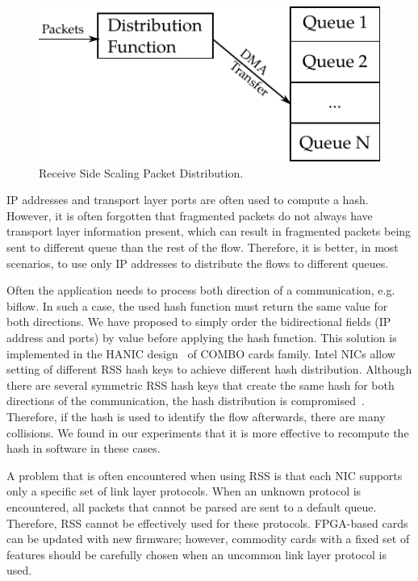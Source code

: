 \begin{figure}[t!]
  \begin{center}
    \includegraphics{figures/c05/rss}
  \end{center}
  \caption{Receive Side Scaling Packet Distribution.}
  \label{fig:rss}
\end{figure}

IP addresses and transport layer ports are often used to compute a hash. However, it is often forgotten that fragmented packets do not always have transport layer information present, which can result in fragmented packets being sent to different queue than the rest of the flow. Therefore, it is better, in most scenarios, to use only IP addresses to distribute the flows to different queues.

Often the application needs to process both direction of a communication, e.g. biflow. In such a case, the used hash function must return the same value for both directions. We have proposed to simply order the bidirectional fields (IP address and ports) by value before applying the hash function. This solution is implemented in the HANIC design~\cite{Liberouter--Hanic} of COMBO cards family. Intel NICs allow setting of different RSS hash keys to achieve different hash distribution. Although there are several symmetric RSS hash keys that create the same hash for both directions of the communication, the hash distribution is compromised~\cite{Woo-2012-Scalable}. Therefore, if the hash is used to identify the flow afterwards, there are many collisions. We found in our experiments that it is more effective to recompute the hash in software in these cases.

A problem that is often encountered when using RSS is that each NIC supports only a specific set of link layer protocols. When an unknown protocol is encountered, all packets that cannot be parsed are sent to a default queue. Therefore, RSS cannot be effectively used for these protocols. FPGA-based cards can be updated with new firmware; however, commodity cards with a fixed set of features should be carefully chosen when an uncommon link layer protocol is used.

